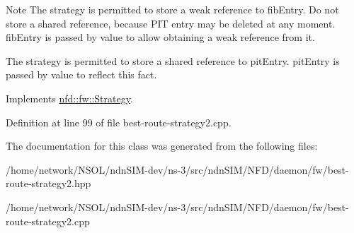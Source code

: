 \begin{DoxyNote}{Note}
The strategy is permitted to store a weak reference to fib\+Entry. Do not store a shared reference, because P\+IT entry may be deleted at any moment. fib\+Entry is passed by value to allow obtaining a weak reference from it. 

The strategy is permitted to store a shared reference to pit\+Entry. pit\+Entry is passed by value to reflect this fact. 
\end{DoxyNote}


Implements \hyperlink{classnfd_1_1fw_1_1Strategy_a1193c1881f92b1618a1004f92669eaaa}{nfd\+::fw\+::\+Strategy}.



Definition at line 99 of file best-\/route-\/strategy2.\+cpp.



The documentation for this class was generated from the following files\+:\begin{DoxyCompactItemize}
\item 
/home/network/\+N\+S\+O\+L/ndn\+S\+I\+M-\/dev/ns-\/3/src/ndn\+S\+I\+M/\+N\+F\+D/daemon/fw/best-\/route-\/strategy2.\+hpp\item 
/home/network/\+N\+S\+O\+L/ndn\+S\+I\+M-\/dev/ns-\/3/src/ndn\+S\+I\+M/\+N\+F\+D/daemon/fw/best-\/route-\/strategy2.\+cpp\end{DoxyCompactItemize}
